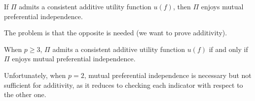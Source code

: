 \begin{theo}
	If $\Pi$ admits a consistent additive utility function $u(f)$, then $\Pi$ enjoys mutual preferential independence.
\end{theo}

The problem is that the opposite is needed (we want to prove additivity). \\

\begin{theo}
	When $p \geq 3$, $\Pi$ admits a consistent additive utility function $u(f)$ if and only if $\Pi$ enjoys mutual preferential independence.
\end{theo}

Unfortunately, when $p=2$, mutual preferential independence is necessary but not sufficient for additivity, as it reduces to checking each indicator with respect to the other one.

